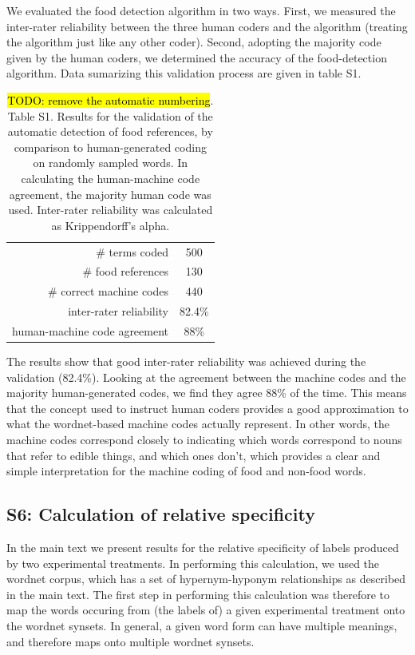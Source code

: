 \documentclass[12pt]{article}
\newcommand{\td}[1]{{\color{blu}\hl{TODO: #1}}}
\begin{document}
We evaluated the food detection algorithm in two ways.  First, we measured
the inter-rater reliability between the three human coders and the algorithm
(treating the algorithm just like any other coder).  Second, adopting the 
majority code given by the human coders, we determined the accuracy of the
food-detection algorithm.  Data sumarizing this validation process are given
in table S1.

\begin{table}
\centering
\setlength{\tabcolsep}{12pt}
\begin{tabular}{ r | c }
\toprule    
\# terms coded & 500 \\
\# food references & 130 \\
\# correct machine codes & 440 \\
inter-rater reliability & 82.4\% \\
human-machine code agreement & 88\% \\
\bottomrule
\end{tabular}
\caption{\footnotesize{
	\td{remove the automatic numbering}. Table S1. Results for the validation 
	of the automatic detection of food references, by comparison to
	human-generated coding on randomly sampled words.  In calculating the 
	human-machine code agreement, the majority human code was used.
	Inter-rater reliability was calculated as Krippendorff's alpha.
}}
\end{table}

The results show that good inter-rater reliability was achieved during the
validation (82.4\%).  Looking at the agreement between the 
machine codes and the majority human-generated codes, we find they agree
88\% of the time.  This means that the concept used to instruct human coders
provides a good approximation to what the wordnet-based machine codes actually
represent. In other words, the machine codes correspond closely to indicating
which words correspond to nouns that refer to edible things, and which ones
don't, which provides a clear and simple interpretation for the machine
coding of food and non-food words.

\subsection*{S6: Calculation of relative specificity}
In the main text we present results for the relative specificity of labels
produced by two experimental treatments.  In performing this calculation,
we used the wordnet corpus, which has a set of hypernym-hyponym relationships
as described in the main text.  The first step in performing this calculation
was therefore to map the words occuring from (the labels of) a given 
experimental treatment onto the wordnet synsets.  In general, a given word
form can have multiple meanings, and therefore maps onto multiple wordnet 
synsets.
\end{document}
